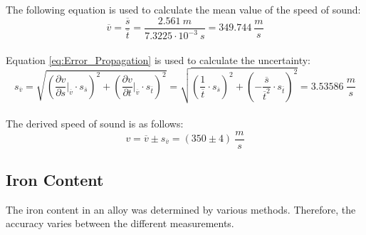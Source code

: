 The following equation is used to calculate the mean value of the speed of sound:
\begin{equation}
\overline{v}=\frac{\overline s}{\overline t}=\frac{2.561\ m}{7.3225\cdot10^{-3}\ s}=349.744\ \frac{m}{s}
\label{eq:Speed_of_Sound}
\end{equation}
\\
Equation \ref{eq:Error_Propagation} is used to calculate the uncertainty:
\begin{equation}
s_{\overline{v}}=\sqrt{\left(\frac{\partial v}{\partial s}\Biggr|_{\overline v}\cdot s_{\overline{s}}\right)^2 + \left(\frac{\partial v}{\partial t}\Biggr|_{\overline v}\cdot s_{\overline{t}}\right)^2}=\sqrt{\left(\frac{1}{\overline t}\cdot s_{\overline{s}}\right)^2 + \left(-\frac{\overline{s}}{\overline{t}^2}\cdot s_{\overline{t}}\right)^2}=3.53586\ \frac{m}{s}
\end{equation}
\\
The derived speed of sound is as follows:
\begingroup
\Large
\begin{equation}
v=\overline{v}\pm s_{\overline v}=(350\pm4)\ \frac{m}{s}
\end{equation}
\endgroup
\newpage
\subsection{Iron Content}
\label{subsec:Iron_Content}
The iron content in an alloy was determined by various methods. Therefore, the accuracy varies between the different measurements.

